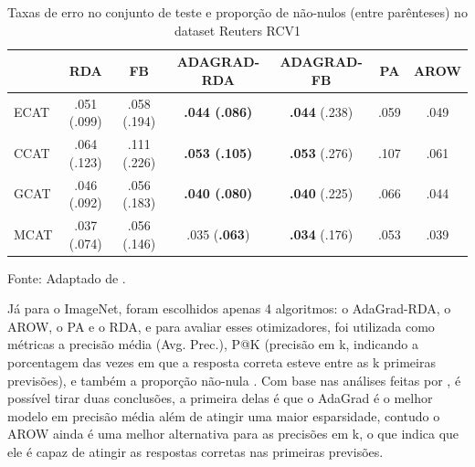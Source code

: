 \begin{table}[htbp]
    \centering
    \begin{threeparttable} %
        \caption{Taxas de erro no conjunto de teste e proporção de não-nulos (entre parênteses) no dataset Reuters RCV1}
        \label{tab:resultados-rcv1-adgrad}
        \begin{tabular}{l c c c c c c}
            \toprule
             & RDA & FB & ADAGRAD-RDA & ADAGRAD-FB & PA & AROW \\
            \midrule
            ECAT & .051 (.099) & .058 (.194) & \textbf{.044 (.086)} & \textbf{.044} (.238) & .059 & .049 \\
            CCAT & .064 (.123) & .111 (.226) & \textbf{.053 (.105)} & \textbf{.053} (.276) & .107 & .061 \\
            GCAT & .046 (.092) & .056 (.183) & \textbf{.040 (.080)} & \textbf{.040} (.225) & .066 & .044 \\
            MCAT & .037 (.074) & .056 (.146) & .035 (\textbf{.063}) & \textbf{.034} (.176) & .053 & .039 \\
            \bottomrule
        \end{tabular}
        
        \begin{tablenotes}[para] %
            \small %
            \item[] Fonte: Adaptado de \parencite{AdaGradMethod}.
        \end{tablenotes}

    \end{threeparttable} %
\end{table}

Já para o ImageNet, foram escolhidos apenas 4 algoritmos: o AdaGrad-RDA, o AROW, o PA e o RDA, e para avaliar esses otimizadores, foi utilizada como métricas a precisão média (Avg. Prec.), P@K (precisão em k, indicando a porcentagem das vezes em que a resposta correta esteve entre as k primeiras previsões), e também a proporção não-nula \parencite{AdaGradMethod}. Com base nas análises feitas por \textcite{AdaGradMethod}, é possível tirar duas conclusões, a primeira delas é que o AdaGrad é o melhor modelo em precisão média além de atingir uma maior esparsidade, contudo o AROW ainda é uma melhor alternativa para as precisões em k, o que indica que ele é capaz de atingir as respostas corretas nas primeiras previsões.

